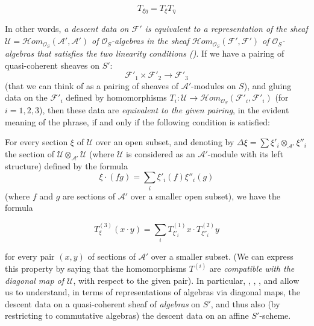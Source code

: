 \begin{equation}\tag{3.3}\label{fga3.i-b.3-equation-3.3}
    T_{\xi\eta} = T_\xi T_\eta
\end{equation}

In other words, \emph{a descent data on $\mathcal{F}'$ is equivalent to a representation of the sheaf $\mathcal{U}=\mathcal{H}om_{\mathcal{O}_S}(\mathcal{A}',\mathcal{A}')$ of $\mathcal{O}_S$-algebras in the sheaf $\mathcal{H}om_{\mathcal{O}_S}(\mathcal{F}',\mathcal{F}')$ of $\mathcal{O}_S$-algebras that satisfies the two linearity conditions ()}.
If we have a pairing of quasi-coherent sheaves on $S'$:
\[
    \mathcal{F}'_1\times\mathcal{F}'_2 \to \mathcal{F}'_3
\]
(that we can think of as a pairing of sheaves of $\mathcal{A}'$-modules on $S$), and gluing data on the $\mathcal{F}'_i$ defined by homomorphisms $T_i\colon\mathcal{U}\to\mathcal{H}om_{\mathcal{O}_S}(\mathcal{F}'_i,\mathcal{F}'_i)$ (for $i=1,2,3$), then these data are \emph{equivalent to the given pairing}, in the evident meaning of the phrase, if and only if the following condition is satisfied:


For every section $\xi$ of $\mathcal{U}$ over an open subset, and denoting by $\Delta\xi=\sum\xi'_i\otimes_{\mathcal{A}'}\xi''_i$ the section of $\mathcal{U}\otimes_{\mathcal{A}'}\mathcal{U}$ (where $\mathcal{U}$ is considered as an $\mathcal{A}'$-module with its left structure) defined by the formula
\[
    \xi\cdot(fg)
    = \sum_i\xi'_i(f)\xi''_i(g)
\]
(where $f$ and $g$ are sections of $\mathcal{A}'$ over a smaller open subset), we have the formula

\begin{equation}\tag{3.4}\label{fga3.i-b.3-equation-3.4}
    T_\xi^{(3)}(x\cdot y)
    = \sum_i T_{\xi'_i}^{(1)}x\cdot T_{\xi''_i}^{(2)}y
\end{equation}

for every pair $(x,y)$ of sections of $\mathcal{A}'$ over a smaller subset.
(We can express this property by saying that the homomorphisms $T^{(i)}$ are \emph{compatible with the diagonal map of $\mathcal{U}$}, with respect to the given pair).
In particular, , , , and  allow us to understand, in terms of representations of algebras via diagonal maps, the descent data on a quasi-coherent sheaf of \emph{algebras} on $S'$, and thus also (by restricting to commutative algebras) the descent data on an affine $S'$-scheme.




